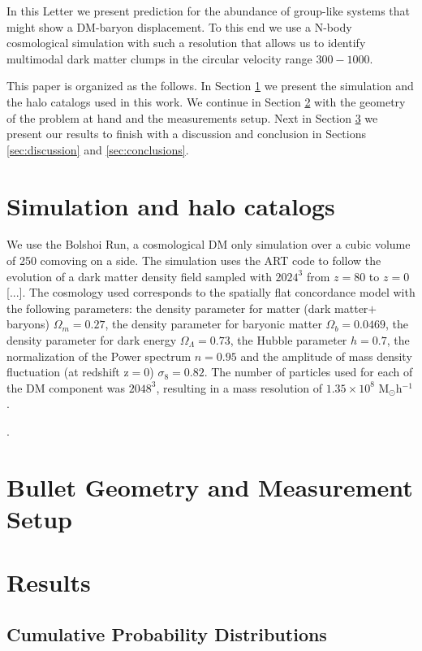\documentclass{emulateapj}
\newcommand{\hMpc}{{\ifmmode{h^{-1}{\rm Mpc}}\else{$h^{-1}$Mpc }\fi}}
\newcommand{\kms}{{\ifmmode{{\mathrm{\,km\ s}^{-1}}}\else{\,km~s$^{-1}$}\fi}}
\begin{document}
In this Letter we present prediction for the abundance of group-like
systems that might show a DM-baryon displacement. To this end we use a
N-body cosmological simulation with such a resolution that allows us
to identify multimodal dark matter clumps in the circular velocity
range $300-1000$\kms. 

This paper is organized as the follows. In Section
\ref{sec:simulation} we present the simulation and the halo catalogs
used in this work. We continue in Section \ref{sec:setup} with the
geometry of the problem at hand and the measurements setup. Next in
Section \ref{sec:results} we present our results to finish with a
discussion and conclusion in Sections \ref{sec:discussion} and
\ref{sec:conclusions}. 


\section{Simulation and halo catalogs}
\label{sec:simulation}

We use the Bolshoi Run, a cosmological DM only simulation over a cubic
volume of 250 comoving \hMpc on a side. The simulation uses the ART code to
follow the evolution of  a dark matter density field sampled with
$2024^3$ from $z=80$ to $z=0$ [...]. The cosmology used  corresponds to  the spatially flat
concordance model with the following parameters:  the density
parameter for matter (dark matter$+$baryons) $\Omega_m=0.27$, the
density parameter for baryonic matter  $\Omega_b=0.0469$, the density
parameter for dark energy $\Omega_{\Lambda}=0.73$, the Hubble
parameter $h=0.7$, the 
normalization of the Power spectrum $n=0.95$ and the amplitude of mass
density fluctuation (at redshift z$=$0) $\sigma_8=0.82$.  The number
of particles used for each of the DM component was $2048^3$, resulting
in a mass resolution of $1.35 \times 10^8$ M$_{\odot}$h$^{-1}$.   

\citet{2011ApJ...740..102K}. 

\section{Bullet Geometry and Measurement Setup}
\label{sec:setup}

\section{Results}
\label{sec:results}

\subsection{Cumulative Probability Distributions}
\label{cumulative_distribution}
\end{document}
